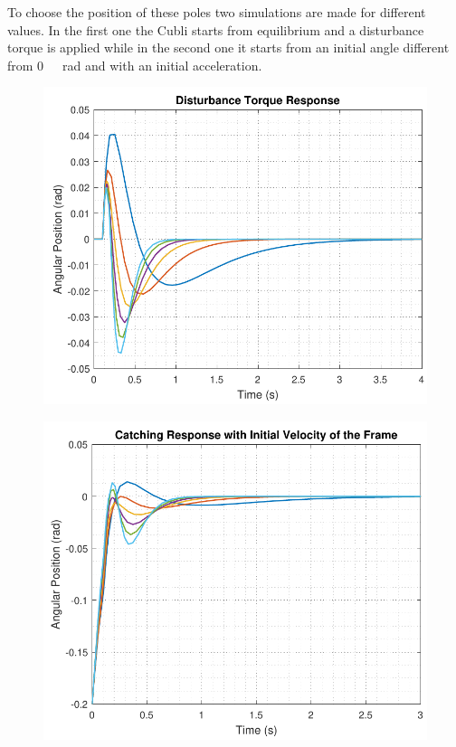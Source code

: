 To choose the position of these poles two simulations are made for different values. In the first one the Cubli starts from equilibrium and a disturbance torque is applied while in the second one it starts from an initial angle different from \si{0\ rad} and with an initial acceleration.
%
\begin{minipage}{\linewidth}
	\begin{minipage}{0.45\linewidth}
		\begin{figure}[H]
			\includegraphics[scale=.55]{figures/disturbanceStateSpace}
			\centering
			\captionsetup{justification=centering}
			\label{disturbanceStateSpace}
		\end{figure}
	\end{minipage}
	\hspace{0.03\linewidth}
	\begin{minipage}{0.45\linewidth}
		\begin{figure}[H]\vspace{4mm}
			\includegraphics[scale=.55]{figures/catchingStateSpace}

\end{figure}
\end{minipage}
\end{minipage}

